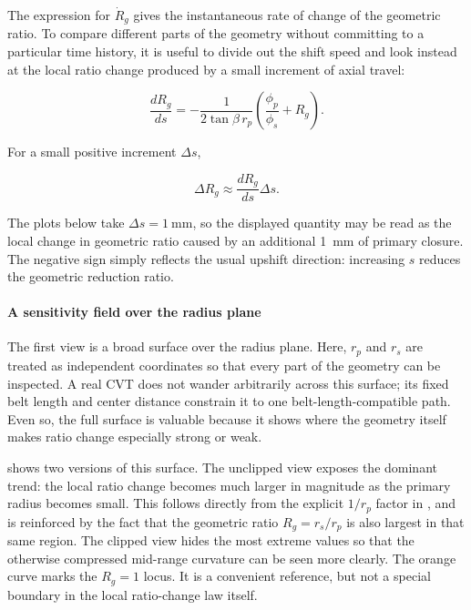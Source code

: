 \documentclass[11pt]{report}
\begin{document}
The expression for \(\dot R_g\) gives the instantaneous rate of change of the
geometric ratio. To compare different parts of the geometry without committing
to a particular time history, it is useful to divide out the shift speed and
look instead at the local ratio change produced by a small increment of axial
travel:

\begin{equation}
\frac{dR_g}{ds}
=
-\frac{1}{2\tan\beta\,r_p}
\left(
\frac{\phi_p}{\phi_s}+R_g
\right).
\label{eq:appendix_local_ratio_gain}
\end{equation}

For a small positive increment \(\Delta s\),

\begin{equation}
\Delta R_g
\approx
\frac{dR_g}{ds}\Delta s.
\label{eq:appendix_local_ratio_increment}
\end{equation}

The plots below take \(\Delta s=\SI{1}{\milli\metre}\), so the displayed
quantity may be read as the local change in geometric ratio caused by an
additional \SI{1}{\milli\metre} of primary closure. The negative sign simply
reflects the usual upshift direction: increasing \(s\) reduces the geometric
reduction ratio.

\paragraph{A sensitivity field over the radius plane}

The first view is a broad surface over the radius plane. Here, \(r_p\) and
\(r_s\) are treated as independent coordinates so that every part of the
geometry can be inspected. A real CVT does not wander arbitrarily across this
surface; its fixed belt length and center distance constrain it to one
belt-length-compatible path. Even so, the full surface is valuable because it
shows where the geometry itself makes ratio change especially strong or weak.

 shows two versions of this surface. The
unclipped view exposes the dominant trend: the local ratio change becomes much
larger in magnitude as the primary radius becomes small. This follows directly
from the explicit \(1/r_p\) factor in , and
is reinforced by the fact that the geometric ratio \(R_g=r_s/r_p\) is also
largest in that same region. The clipped view hides the most extreme values so
that the otherwise compressed mid-range curvature can be seen more clearly. The
orange curve marks the \(R_g=1\) locus. It is a convenient reference, but not a
special boundary in the local ratio-change law itself.
\end{document}
